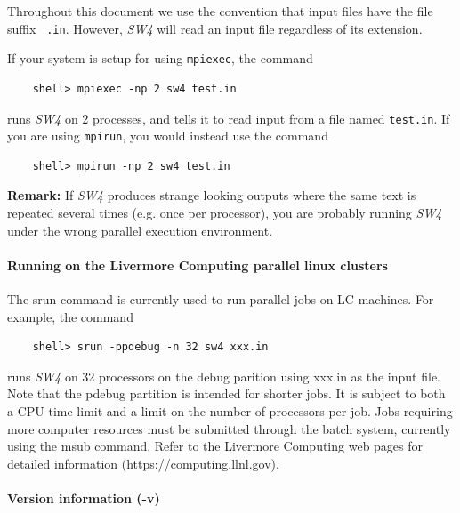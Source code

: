 \documentclass[11pt]{report}
\begin{document}
Throughout this document we use the convention that input files have the file suffix {\tt
  .in}. However, \emph{SW4} will read an input file regardless of its extension.

If your system is setup for using \verb+mpiexec+, the command
\begin{verbatim}
	shell> mpiexec -np 2 sw4 test.in
\end{verbatim}
runs \emph{SW4} on 2 processes, and tells it to read input from a file named {\tt test.in}.  If you
are using \verb+mpirun+, you would instead use the command
\begin{verbatim}
	shell> mpirun -np 2 sw4 test.in
\end{verbatim}
{\bf Remark: }
If \emph{SW4} produces strange looking outputs where the same text is repeated several times (e.g. once
per processor), you are probably running \emph{SW4} under the wrong parallel execution environment.
%

\paragraph{Running on the Livermore Computing parallel linux clusters}
%
The srun command is currently used to run parallel jobs on LC machines. For example, the command
\begin{verbatim}
	shell> srun -ppdebug -n 32 sw4 xxx.in
\end{verbatim}
runs \emph{SW4} on 32 processors on the debug parition using xxx.in as the input file. Note that the
pdebug partition is intended for shorter jobs. It is subject to both a CPU time limit and a limit on
the number of processors per job. Jobs requiring more computer resources must be submitted through
the batch system, currently using the msub command. Refer to the Livermore Computing web pages for
detailed information (https://computing.llnl.gov).

\paragraph{Version information (-v)}
\end{document}
